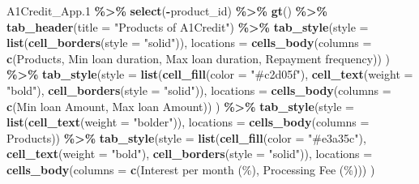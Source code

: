 \documentclass[
]{article}
\newenvironment{Shaded}{\begin{snugshade}}{\end{snugshade}}
\newcommand{\AttributeTok}[1]{\textcolor[rgb]{0.13,0.29,0.53}{#1}}
\newcommand{\FloatTok}[1]{\textcolor[rgb]{0.00,0.00,0.81}{#1}}
\newcommand{\FunctionTok}[1]{\textcolor[rgb]{0.13,0.29,0.53}{\textbf{#1}}}
\newcommand{\NormalTok}[1]{#1}
\newcommand{\SpecialCharTok}[1]{\textcolor[rgb]{0.81,0.36,0.00}{\textbf{#1}}}
\newcommand{\StringTok}[1]{\textcolor[rgb]{0.31,0.60,0.02}{#1}}
\begin{document}
\begin{Shaded}
\begin{Highlighting}[]
\NormalTok{A1Credit\_App}\FloatTok{.1} \SpecialCharTok{\%\textgreater{}\%}
  \FunctionTok{select}\NormalTok{(}\SpecialCharTok{{-}}\NormalTok{product\_id) }\SpecialCharTok{\%\textgreater{}\%} 
  \FunctionTok{gt}\NormalTok{() }\SpecialCharTok{\%\textgreater{}\%} 
  \FunctionTok{tab\_header}\NormalTok{(}\AttributeTok{title =} \StringTok{"Products of A1Credit"}\NormalTok{) }\SpecialCharTok{\%\textgreater{}\%} 
  \FunctionTok{tab\_style}\NormalTok{(}\AttributeTok{style =} \FunctionTok{list}\NormalTok{(}\FunctionTok{cell\_borders}\NormalTok{(}\AttributeTok{style =} \StringTok{"solid"}\NormalTok{)),}
            \AttributeTok{locations =} \FunctionTok{cells\_body}\NormalTok{(}\AttributeTok{columns =} \FunctionTok{c}\NormalTok{(Products, }\StringTok{\textasciigrave{}}\AttributeTok{Min loan duration}\StringTok{\textasciigrave{}}\NormalTok{, }\StringTok{\textasciigrave{}}\AttributeTok{Max loan duration}\StringTok{\textasciigrave{}}\NormalTok{, }\StringTok{\textasciigrave{}}\AttributeTok{Repayment frequency}\StringTok{\textasciigrave{}}\NormalTok{))}
\NormalTok{            ) }\SpecialCharTok{\%\textgreater{}\%} 
  \FunctionTok{tab\_style}\NormalTok{(}\AttributeTok{style =} \FunctionTok{list}\NormalTok{(}\FunctionTok{cell\_fill}\NormalTok{(}\AttributeTok{color =} \StringTok{"\#c2d05f"}\NormalTok{), }
                         \FunctionTok{cell\_text}\NormalTok{(}\AttributeTok{weight =} \StringTok{"bold"}\NormalTok{), }\FunctionTok{cell\_borders}\NormalTok{(}\AttributeTok{style =} \StringTok{"solid"}\NormalTok{)),}
            \AttributeTok{locations =} \FunctionTok{cells\_body}\NormalTok{(}\AttributeTok{columns =} \FunctionTok{c}\NormalTok{(}\StringTok{\textasciigrave{}}\AttributeTok{Min loan Amount}\StringTok{\textasciigrave{}}\NormalTok{, }\StringTok{\textasciigrave{}}\AttributeTok{Max loan Amount}\StringTok{\textasciigrave{}}\NormalTok{))}
\NormalTok{            ) }\SpecialCharTok{\%\textgreater{}\%} 
  \FunctionTok{tab\_style}\NormalTok{(}\AttributeTok{style =} \FunctionTok{list}\NormalTok{(}\FunctionTok{cell\_text}\NormalTok{(}\AttributeTok{weight =} \StringTok{"bolder"}\NormalTok{)),}
            \AttributeTok{locations =} \FunctionTok{cells\_body}\NormalTok{(}\AttributeTok{columns =}\NormalTok{ Products)) }\SpecialCharTok{\%\textgreater{}\%} 
  \FunctionTok{tab\_style}\NormalTok{(}\AttributeTok{style =} \FunctionTok{list}\NormalTok{(}\FunctionTok{cell\_fill}\NormalTok{(}\AttributeTok{color =} \StringTok{"\#e3a35c"}\NormalTok{),}
                         \FunctionTok{cell\_text}\NormalTok{(}\AttributeTok{weight =} \StringTok{"bold"}\NormalTok{), }\FunctionTok{cell\_borders}\NormalTok{(}\AttributeTok{style =} \StringTok{"solid"}\NormalTok{)),}
            \AttributeTok{locations =} \FunctionTok{cells\_body}\NormalTok{(}\AttributeTok{columns =} \FunctionTok{c}\NormalTok{(}\StringTok{\textasciigrave{}}\AttributeTok{Interest per month (\%)}\StringTok{\textasciigrave{}}\NormalTok{, }\StringTok{\textasciigrave{}}\AttributeTok{Processing Fee (\%)}\StringTok{\textasciigrave{}}\NormalTok{))}
\NormalTok{            )}
\end{Highlighting}
\end{Shaded}
\end{document}
